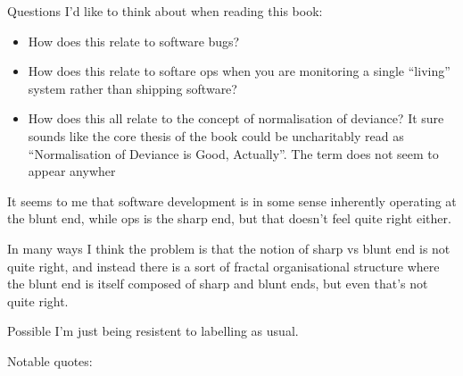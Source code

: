\documentclass[a4paper]{book}
\begin{document}
Questions I'd like to think about when reading this book:

\begin{itemize}
\item How does this relate to software bugs?
\item How does this relate to softare ops when you are monitoring a single ``living'' system rather than shipping software?
\item How does this all relate to the concept of normalisation of deviance\cite{NormalisationOfDeviance}?
It sure sounds like the core thesis of the book could be uncharitably read as ``Normalisation of Deviance is Good, Actually''.
The term does not seem to appear anywher 
\end{itemize}

It seems to me that software development is in some sense inherently operating at the blunt end,
while ops is the sharp end,
but that doesn't feel quite right either.

In many ways I think the problem is that the notion of sharp vs blunt end is not quite right,
and instead there is a sort of fractal organisational structure where the blunt end is itself composed of sharp and blunt ends,
but even that's not quite right.

Possible I'm just being resistent to labelling as usual.

Notable quotes:
\end{document}
